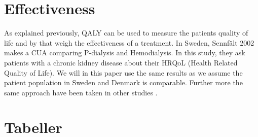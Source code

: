 \documentclass[a4paper,12pt]{article}
\begin{document}
\section{Effectiveness}
As explained previously, QALY can be used to measure the patients quality of life and by that weigh the effectiveness of a treatment. In Sweden, Sennfält 2002 makes a CUA comparing P-dialysis and Hemodialysis. In this study, they ask patients with a chronic kidney disease about their HRQoL (Health Related Quality of Life). We will in this paper use the same results as we assume the patient population in Sweden and Denmark is comparable. Further more the same approach have been taken in other studies \cite{CUAdkartikel}.  


\section{Tabeller}
\end{document}
